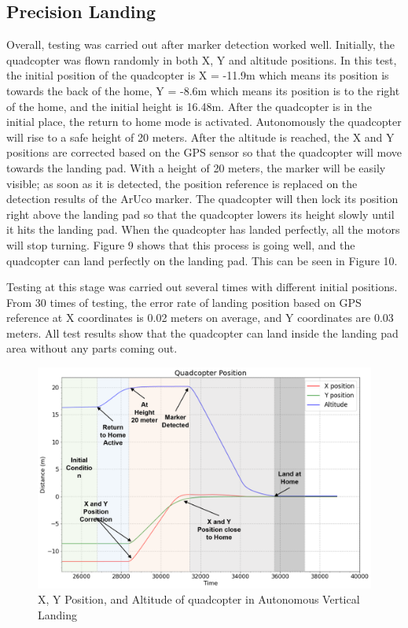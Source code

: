 \documentclass[a4paper]{jpconf}
\begin{document}
\subsection{Precision Landing}
Overall, testing was carried out after marker detection worked well. Initially, the quadcopter was flown randomly in both X, Y and altitude positions. In this test, the initial position of the quadcopter is X = -11.9m which means its position is towards the back of the home, Y = -8.6m which means its position is to the right of the home, and the initial height is 16.48m. After the quadcopter is in the initial place, the return to home mode is activated. Autonomously the quadcopter will rise to a safe height of 20 meters. After the altitude is reached, the X and Y positions are corrected based on the GPS sensor so that the quadcopter will move towards the landing pad. With a height of 20 meters, the marker will be easily visible; as soon as it is detected, the position reference is replaced on the detection results of the ArUco marker. The quadcopter will then lock its position right above the landing pad so that the quadcopter lowers its height slowly until it hits the landing pad. When the quadcopter has landed perfectly, all the motors will stop turning. Figure 9 shows that this process is going well, and the quadcopter can land perfectly on the landing pad. This can be seen in Figure 10.

Testing at this stage was carried out several times with different initial positions. From 30 times of testing, the error rate of landing position based on GPS reference at X coordinates is 0.02 meters on average, and Y coordinates are 0.03 meters. All test results show that the quadcopter can land inside the landing pad area without any parts coming out.

\begin{figure}[h]
    \centering
    \includegraphics[width=28pc]{graph-response-position-edited.png}
    \caption{\label{label}X, Y Position, and Altitude of quadcopter in Autonomous Vertical Landing}
\end{figure}
\end{document}
